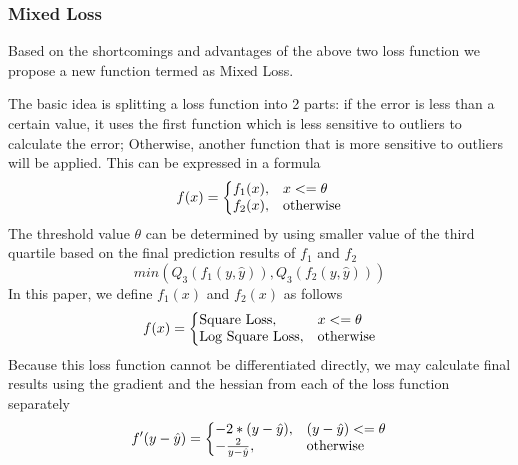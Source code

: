 \documentclass[runningheads]{llncs}
\begin{document}
\subsubsection{Mixed Loss} Based on the shortcomings and advantages of the above two loss function we propose a new function termed as Mixed Loss. %

The basic idea is splitting a loss function into 2 parts: if the error is less than a certain value, it uses the first function which is less sensitive to outliers to calculate the error; Otherwise, another function that is more sensitive to outliers will be applied. This can be expressed in a formula
\begin{equation}
  f(x)=\left\{
  \begin{array}{@{}ll@{}}
    f_1(x), & x<=\theta \\
    f_2(x), & \text{otherwise}
  \end{array}\right.
\end{equation}
The threshold value $\theta$ can be determined by using smaller value of the third quartile based on the final prediction results of $f_1$ and $f_2$
\begin{equation}
    min(Q_3(f_1(y, \hat{y})), Q_3(f_2(y, \hat{y})))
\end{equation}
In this paper, we define $f_1(x)$ and $f_2(x)$ as follows
\begin{equation}
  f(x)=\left\{
  \begin{array}{@{}ll@{}}
    \text{Square Loss}, & x<=\theta \\
    \text{Log Square Loss}, & \text{otherwise}
  \end{array}\right.
\end{equation}
Because this loss function cannot be differentiated directly, we may calculate final results using the gradient and the hessian from each of the loss function separately
\begin{equation}
  f'(y - \hat{y})=\left\{
  \begin{array}{@{}ll@{}}
    -2*(y - \hat{y}), &  (y - \hat{y})<=\theta \\
    -\frac{2}{y - \hat{y}}, & \text{otherwise}
  \end{array}\right.
\end{equation}
\end{document}
